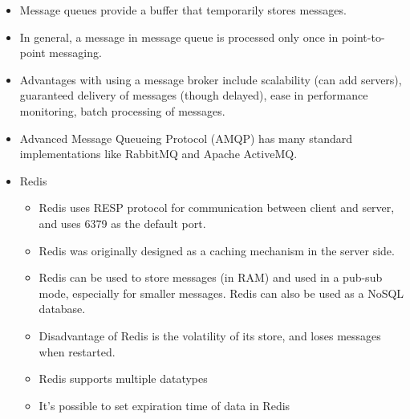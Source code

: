 \documentclass[a4paper]{article}
\begin{document}
\begin{itemize}
    \item Message queues provide a buffer that temporarily stores messages.
    \item In general, a message in message queue is processed only once in point-to-point messaging.
    \item Advantages with using a message broker include scalability (can add servers), guaranteed delivery of messages (though delayed), ease in performance monitoring, batch processing of messages.
    \item Advanced Message Queueing Protocol (AMQP) has many standard implementations like RabbitMQ and Apache ActiveMQ.
    \item Redis
    \begin{itemize}
        \item Redis uses RESP protocol for communication between client and server, and uses 6379 as the default port.
        \item Redis was originally designed as a caching mechanism  in the server side.
        \item Redis can be used to store messages (in RAM) and used in a pub-sub mode, especially for smaller messages.  Redis can also be used as a NoSQL database.
        \item Disadvantage of Redis is the volatility of its store, and loses messages when restarted.
        \item Redis supports multiple datatypes
        \item It’s possible to set expiration time of data in Redis
    \end{itemize}
\end{itemize}
\end{document}
